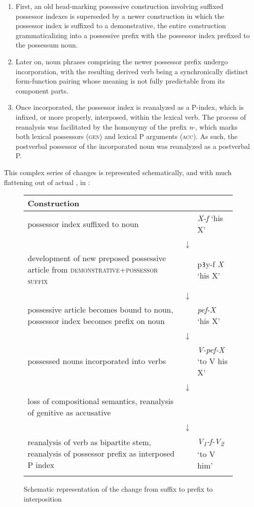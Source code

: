 \documentclass[output=paper]{LSP/langsci}
\begin{document}
\begin{enumerate}
\item 
First, an old head-marking possessive construction involving suffixed possessor indexes is superseded by a newer construction in which the possessor index is suffixed to a demonstrative, the entire construction grammaticalizing into a possessive prefix with the possessor index prefixed to the possessum noun. 

\item 
Later on, noun phrases comprising the newer possessor prefix undergo incorporation, with the resulting derived verb being a synchronically distinct form-function pairing whose meaning is not fully predictable from its component parts. 

\item 
Once incorporated, the possessor index is reanalyzed as a P-index, which is infixed, or more properly, interposed, within the lexical verb. The process of reanalysis was facilitated by the homonymy of the prefix \textit{n}-, which marks both lexical possessors (\textsc{gen}) and lexical P arguments (\textsc{acc}). As such, the postverbal possessor of the incorporated noun was reanalyzed as a postverbal P. 

\end{enumerate}

This complex series of changes is represented schematically, and with much flattening out of actual , in :


\begin{figure}
\begin{tabularx}{\textwidth}{Qcl}
\lsptoprule
 Construction && \\
 \midrule
possessor index suffixed to noun && \textit{X-f} ‘his X’\\
 &↓ & \\
development of new preposed possessive article\textsc{} from\textsc{ demonstrative+possessor suffix} && p\texttt{Ꜣ}y-f \textit{X} ‘his X’\\
 &↓ & \\
possessive article becomes bound to noun, possessor index becomes prefix on noun && \textit{pef-X} ‘his X’\\
 &↓ & \\
possessed nouns incorporated into verbs && \textit{V-pef-X} ‘to V his X’\\
 &↓ & \\
loss of compositional semantics, reanalysis of genitive as accusative && \\
  &↓ & \\
reanalysis of verb as bipartite stem, reanalysis of possessor prefix as interposed P index && \textit{V}\textit{\textsubscript{1}}\textit{-f-V}\textit{\textsubscript{2}} ‘to V him’\\
\lspbottomrule
\end{tabularx}
\caption{Schematic representation of the change from suffix to prefix to interposition}
\label{05-gr-fig:1}
\end{figure}
\end{document}
